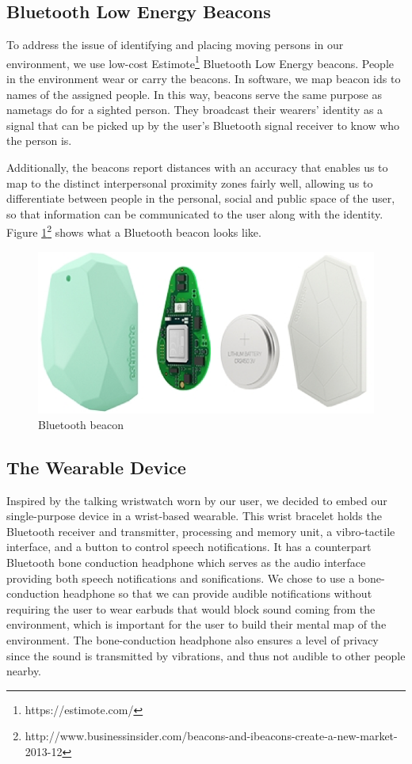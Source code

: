 \subsection{Bluetooth Low Energy Beacons}
To address the issue of identifying and placing moving persons in our environment, we use low-cost Estimote\footnote{https://estimote.com/} Bluetooth Low Energy beacons. People in the environment wear or carry the beacons.  In software, we map beacon ids to names of the assigned people.  In this way, beacons serve the same purpose as nametags do for a sighted person.  They broadcast their wearers' identity as a signal that can be picked up by the user's Bluetooth signal receiver to know who the person is.

Additionally, the beacons report distances with an accuracy that enables us to map to the distinct interpersonal proximity zones fairly well, allowing us to differentiate between people in the personal, social and public space of the user, so that information can be communicated to the user along with the identity.  Figure \ref{fig:beacon}\footnote{http://www.businessinsider.com/beacons-and-ibeacons-create-a-new-market-2013-12} shows what a Bluetooth beacon looks like.

\begin{figure}[htbp]
\centering
\begin{center}
\includegraphics[width=\columnwidth]{figures/ble_hardware.png}
\caption{Bluetooth beacon} 
\label{fig:beacon}
\end{center}
\end{figure}


\subsection{The Wearable Device}
Inspired by the talking wristwatch worn by our user, we decided to embed our single-purpose device in a wrist-based wearable.
This wrist bracelet holds the Bluetooth receiver and transmitter, processing and memory unit, a vibro-tactile interface, and a button to control speech notifications. It has a counterpart Bluetooth bone conduction headphone which serves as the audio interface providing both speech notifications and sonifications. We chose to use a bone-conduction headphone so that we can provide audible notifications without requiring the user to wear earbuds that would block sound coming from the environment, which is important for the user to build their mental map of the environment. The bone-conduction headphone also ensures a level of privacy since the sound is transmitted by vibrations, and thus not audible to other people nearby.

